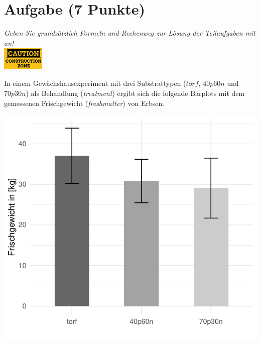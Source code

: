 \documentclass[a4paper, 9pt]{scrartcl}\usepackage[]{graphicx}\usepackage[]{xcolor}
\makeatletter
\def\maxwidth{ %
  \ifdim\Gin@nat@width>\linewidth
    \linewidth
  \else
    \Gin@nat@width
  \fi
}
\makeatother
\begin{document}
 
\clearpage

\section{Aufgabe \hfill (7 Punkte)}

\textit{Geben Sie grunds{\"a}tzlich Formeln und Rechenweg zur L{\"o}sung der
  Teilaufgaben mit an!} \\[1Ex]

\hfill\href{}{\includegraphics[width = 2cm]{img/caution}} %
\hspace{2Ex}



In einem Gew{\"a}chshausexperiment mit drei Substrattypen ($torf$, $40p60n$ und $70p30n$) als Behandlung
(\textit{treatment}) ergibt sich die folgende Barplots mit dem
gemessenen Frischgewicht (\textit{freshmatter}) von Erbsen.




{\centering \includegraphics[width=\maxwidth]{img/barplot-02-1} 

}
\end{document}
